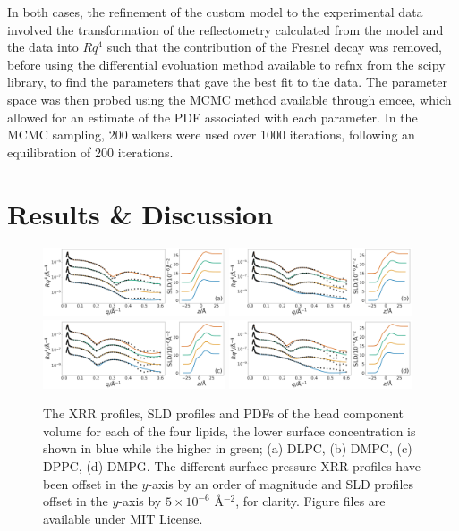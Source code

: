 \documentclass[twoside,twocolumn,9pt]{article}
\begin{document}
In both cases, the refinement of the custom model to the experimental data involved the transformation of the reflectometry calculated from the model and the data into $Rq^4$ such that the contribution of the Fresnel decay was removed, before using the differential evoluation method available to refnx from the scipy library,\cite{Jones2001} to find the parameters that gave the best fit to the data. The parameter space was then probed using the MCMC method available through emcee, which allowed for an estimate of the PDF associated with each parameter. In the MCMC sampling, 200 walkers were used over 1000 iterations, following an equilibration of 200 iterations.

\section{Results \& Discussion}
\begin{figure}
	\centering
	\includegraphics[width=0.48\textwidth]{figures/DLPC_all_data}
	\includegraphics[width=0.48\textwidth]{figures/DMPC_all_data}
	\includegraphics[width=0.48\textwidth]{figures/DPPC_all_data}
	\includegraphics[width=0.48\textwidth]{figures/DMPG_all_data}
	\caption{The XRR profiles, SLD profiles and PDFs of the head component volume for each of the four lipids, the lower surface concentration is shown in blue while the higher in green; (a) DLPC, (b) DMPC, (c) DPPC, (d) DMPG. The different surface pressure XRR profiles have been offset in the $y$-axis by an order of magnitude and SLD profiles offset in the $y$-axis by $5\times10^{-6}$ \AA$^{-2}$, for clarity. Figure files are available under MIT License.\cite{mccluskey_2018}}
	\label{fig:lipids}
\end{figure}
\end{document}
